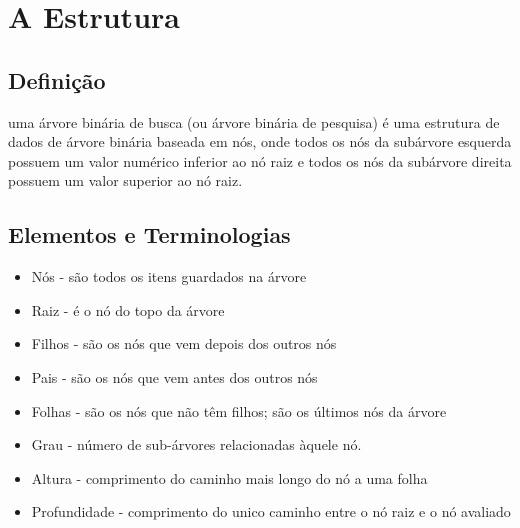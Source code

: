 \chapter{A Estrutura}
\label{cap:estrutura}

\section{Definição}
\label{sec:definicao}
uma árvore binária de busca (ou árvore binária de pesquisa) é uma estrutura de dados de árvore binária baseada em nós, onde todos os nós da subárvore esquerda possuem um valor numérico inferior ao nó raiz e todos os nós da subárvore direita possuem um valor superior ao nó raiz.
\cite{ABBwiki}

\section{Elementos e Terminologias}
\label{sec:elementos}
\begin{itemize}
    \item Nós - são todos os itens guardados na árvore
    \item Raiz - é o nó do topo da árvore 
    \item Filhos - são os nós que vem depois dos outros nós 
    \item Pais - são os nós que vem antes dos outros nós 
    \item Folhas - são os nós que não têm filhos; são os últimos nós da árvore
    \item Grau - número de sub-árvores relacionadas àquele nó.  
    \item Altura - comprimento do caminho mais longo do nó a uma folha 
    \item Profundidade - comprimento do unico caminho entre o nó raiz e o nó avaliado
\end{itemize}